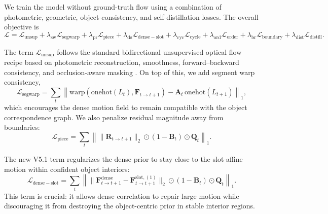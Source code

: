 We train the model without ground-truth flow using a combination of photometric, geometric, object-consistency, and self-distillation losses. The overall objective is
\begin{equation}
\label{eq:total_loss}
\mathcal{L} = \mathcal{L}_{\mathrm{unsup}} + \lambda_{\mathrm{sw}}\mathcal{L}_{\mathrm{segwarp}} + \lambda_{\mathrm{pr}}\mathcal{L}_{\mathrm{piece}} + \lambda_{\mathrm{ds}}\mathcal{L}_{\mathrm{dense-slot}} + \lambda_{\mathrm{cyc}}\mathcal{L}_{\mathrm{cycle}} + \lambda_{\mathrm{ord}}\mathcal{L}_{\mathrm{order}} + \lambda_{\mathrm{br}}\mathcal{L}_{\mathrm{boundary}} + \lambda_{\mathrm{dist}}\mathcal{L}_{\mathrm{distill}}.
\end{equation}

The term $\mathcal{L}_{\mathrm{unsup}}$ follows the standard bidirectional unsupervised optical flow recipe based on photometric reconstruction, smoothness, forward--backward consistency, and occlusion-aware masking \cite{meister2018unflow}. On top of this, we add segment warp consistency,
\begin{equation}
\mathcal{L}_{\mathrm{segwarp}} = \sum_t \left\| \mathrm{warp}(\mathrm{onehot}(L_t),\mathbf{F}_{t\rightarrow t+1}) - \mathbf{A}_t\,\mathrm{onehot}(L_{t+1}) \right\|_1,
\end{equation}
which encourages the dense motion field to remain compatible with the object correspondence graph. We also penalize residual magnitude away from boundaries:
\begin{equation}
\mathcal{L}_{\mathrm{piece}} = \sum_t \left\| \|\mathbf{R}_{t\rightarrow t+1}\|_2 \odot (1-\mathbf{B}_t) \odot \mathbf{Q}_t \right\|_1.
\end{equation}

The new V5.1 term regularizes the dense prior to stay close to the slot-affine motion within confident object interiors:
\begin{equation}
\mathcal{L}_{\mathrm{dense-slot}} = \sum_t \left\| \|\mathbf{F}^{\mathrm{dense}}_{t\rightarrow t+1} - \mathbf{F}^{\mathrm{slot},(1)}_{t\rightarrow t+1}\|_2 \odot (1-\mathbf{B}_t) \odot \mathbf{Q}_t \right\|_1.
\end{equation}
This term is crucial: it allows dense correlation to repair large motion while discouraging it from destroying the object-centric prior in stable interior regions.

